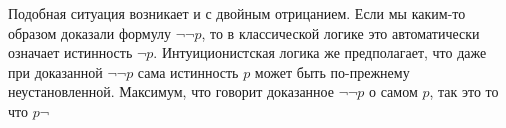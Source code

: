 Подобная ситуация возникает и с двойным отрицанием. Если мы каким-то образом доказали формулу $\neg\neg p$, то в классической логике это автоматически означает истинность $\neg p$. Интуиционистская логика же предполагает, что даже при доказанной $\neg\neg p$ сама истинность $p$ может быть по-прежнему неустановленной. Максимум, что говорит доказанное $\neg\neg p$ о самом $p$, так это то что $p\neg$
